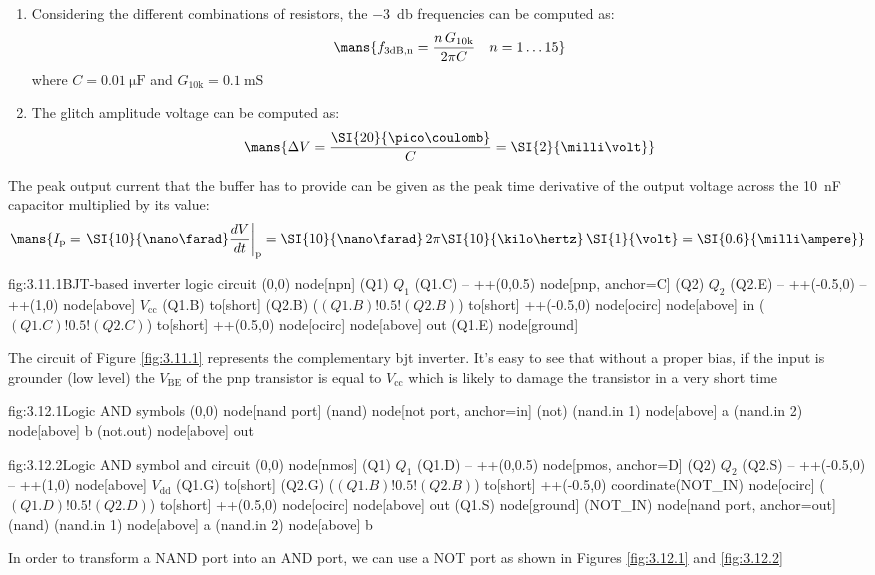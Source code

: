 \begin{enumerate}
    \item Considering the different combinations of resistors, the \SI{-3}{\decibel} frequencies can be computed as:
    \[\mans{f_\text{3dB,n}=\frac{n\,G_\text{10k}}{2\pi C}\quad n=1\dots 15}\]
    where $C=\SI{0.01}{\micro\farad}$ and $G_\text{10k}=\SI{0.1}{\milli\siemens}$
    \item The glitch amplitude voltage can be computed as:
    \[\mans{\Delta V=\frac{\SI{20}{\pico\coulomb}}{C}=\SI{2}{\milli\volt}}\]
\end{enumerate}

The peak output current that the buffer has to provide can be given as the peak time derivative of the output voltage across the \SI{10}{\nano\farad} capacitor multiplied by its value:
\[\mans{I_\text{p}=\left.\SI{10}{\nano\farad}\frac{dV}{dt}\right|_\text{p}=\SI{10}{\nano\farad}\,2\pi\SI{10}{\kilo\hertz}\,\SI{1}{\volt}=\SI{0.6}{\milli\ampere}}\]

\begin{circuit}{fig:3.11.1}{BJT-based inverter logic circuit}
    (0,0) node[npn] (Q1) {$Q_1$}
    (Q1.C) -- ++(0,0.5)
    node[pnp, anchor=C] (Q2) {$Q_2$}
    (Q2.E) -- ++(-0.5,0) -- ++(1,0)
    node[above] {$V_\text{cc}$}
    (Q1.B) to[short] (Q2.B)
    ($(Q1.B)!0.5!(Q2.B)$) to[short] ++(-0.5,0)
    node[ocirc] {}
    node[above] {in}
    ($(Q1.C)!0.5!(Q2.C)$) to[short] ++(0.5,0)
    node[ocirc] {}
    node[above] {out}
    (Q1.E) node[ground] {}
\end{circuit}

The circuit of Figure \ref{fig:3.11.1} represents the complementary bjt inverter. It's easy to see that without a proper bias, if the input is grounder (low level) the $V_\text{BE}$ of the pnp transistor is equal to $V_\text{cc}$ which is likely to damage the transistor in a very short time

\begin{circuit}{fig:3.12.1}{Logic AND symbols}
    (0,0) node[nand port] (nand) {}
    node[not port, anchor=in] (not) {}
    (nand.in 1) node[above] {a}
    (nand.in 2) node[above] {b}
    (not.out) node[above] {out}
\end{circuit}

\begin{circuit}{fig:3.12.2}{Logic AND symbol and circuit}
    (0,0) node[nmos] (Q1) {$Q_1$}
    (Q1.D) -- ++(0,0.5)
    node[pmos, anchor=D] (Q2) {$Q_2$}
    (Q2.S) -- ++(-0.5,0) -- ++(1,0)
    node[above] {$V_\text{dd}$}
    (Q1.G) to[short] (Q2.G)
    ($(Q1.B)!0.5!(Q2.B)$) to[short] ++(-0.5,0) coordinate(NOT_IN)
    node[ocirc] {}
    ($(Q1.D)!0.5!(Q2.D)$) to[short] ++(0.5,0)
    node[ocirc] {}
    node[above] {out}
    (Q1.S) node[ground] {}
    (NOT_IN) node[nand port, anchor=out] (nand) {}
    (nand.in 1) node[above] {a}
    (nand.in 2) node[above] {b}
\end{circuit}
In order to transform a NAND port into an AND port, we can use a NOT port as shown in Figures \ref{fig:3.12.1} and \ref{fig:3.12.2}

